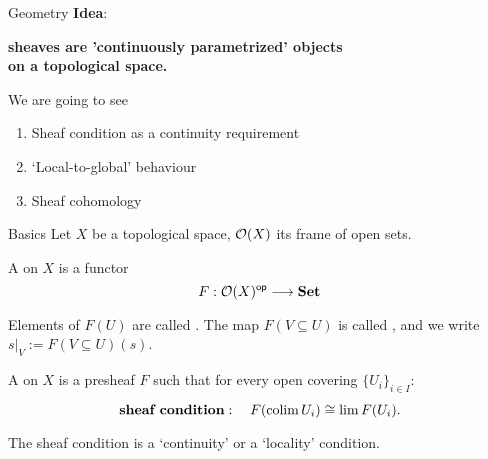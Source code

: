 \begin{framecard}
	{\color{white}
	\bfseries

	}
\end{framecard}

\begin{frame}{Geometry}
	\textbf{Idea}:
	\begin{center}
	\color{red}
	\bfseries
		sheaves are 'continuously parametrized' objects\\on a topological space.
	\end{center}

	We are going to see
	\begin{enumerate}
		\item Sheaf condition as a continuity requirement
		\item `Local-to-global' behaviour
		\item Sheaf cohomology
	\end{enumerate}
\end{frame}

\begin{frame}{Basics}
	Let $X$ be a topological space, $\mathcal{O}(X)$ its frame of open sets.

	\begin{definition}
		A  on $X$ is a functor
		\begin{equation*}
			F: \mathcal{O}(X)^{\mathsf{op}} \longrightarrow \mathbf{Set}
		\end{equation*}
	\end{definition}

	Elements of $F(U)$ are called . The map $F(V \subseteq U)$ is called , and we write $s\vert_V := F(V \subseteq U)(s)$.

	\begin{definition}
		A  on $X$ is a presheaf $F$ such that for every open covering $\{U_i\}_{i \in I}$:
		\begin{equation*}
			\textbf{sheaf condition}: \quad F(\operatorname*{colim} U_i) \overset{}{\cong} \lim F(U_i).
		\end{equation*}
	\end{definition}
	The sheaf condition is a `continuity' or a `locality' condition.
\end{frame}

